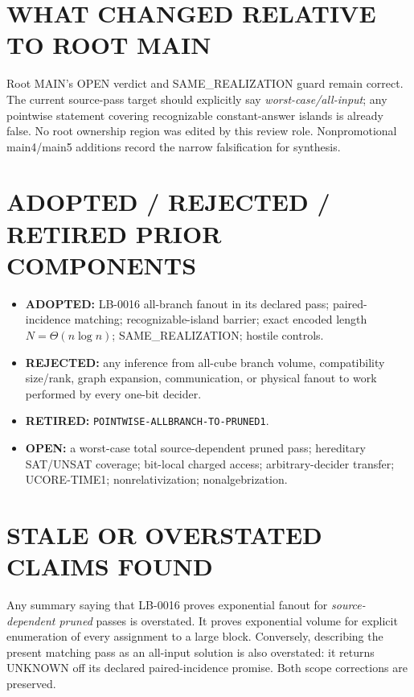 \documentclass[11pt]{article}
\begin{document}
\section{WHAT CHANGED RELATIVE TO ROOT MAIN}

Root MAIN's OPEN verdict and SAME\_REALIZATION guard remain correct.
The current source-pass target should explicitly say
\emph{worst-case/all-input}; any pointwise statement covering recognizable
constant-answer islands is already false.  No root ownership region was
edited by this review role.  Nonpromotional main4/main5 additions record the
narrow falsification for synthesis.

\section{ADOPTED / REJECTED / RETIRED PRIOR COMPONENTS}

\begin{itemize}[leftmargin=1.5em]
\item \textbf{ADOPTED:} LB-0016 all-branch fanout in its declared pass;
paired-incidence matching; recognizable-island barrier; exact encoded length
$N=\Theta(n\log n)$; SAME\_REALIZATION; hostile controls.
\item \textbf{REJECTED:} any inference from all-cube branch volume,
compatibility size/rank, graph expansion, communication, or physical fanout
to work performed by every one-bit decider.
\item \textbf{RETIRED:} \texttt{POINTWISE-ALLBRANCH-TO-PRUNED1}.
\item \textbf{OPEN:} a worst-case total source-dependent pruned pass;
hereditary SAT/UNSAT coverage; bit-local charged access; arbitrary-decider
transfer; UCORE-TIME1; nonrelativization; nonalgebrization.
\end{itemize}

\section{STALE OR OVERSTATED CLAIMS FOUND}

Any summary saying that LB-0016 proves exponential fanout for
\emph{source-dependent pruned} passes is overstated.  It proves exponential
volume for explicit enumeration of every assignment to a large block.
Conversely, describing the present matching pass as an all-input solution is
also overstated: it returns UNKNOWN off its declared paired-incidence
promise.  Both scope corrections are preserved.
\end{document}
